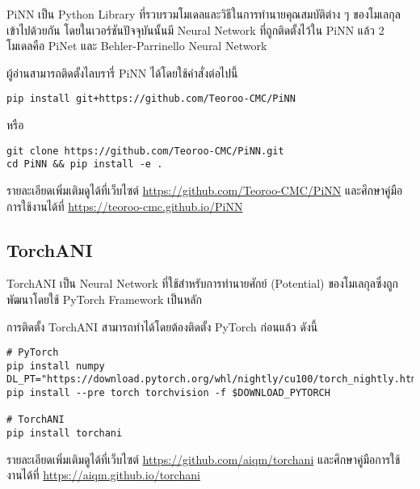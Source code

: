 PiNN\autocite{shao2020} เป็น Python Library ที่รวบรวมโมเดลและวิธีในการทำนายคุณสมบัติต่าง ๆ ของโมเลกุลเข้าไปด้วยกัน โดยในเวอร์ชันปัจจุบันนั้นมี Neural Network ที่ถูกติดตั้งไว้ใน PiNN แล้ว 2 โมเดลคือ PiNet และ Behler-Parrinello Neural Network

ผู้อ่านสามารถติดตั้งไลบรารี่ PiNN ได้โดยใช้คำสั่งต่อไปนี้

\begin{lstlisting}[style=MyBash]
pip install git+https://github.com/Teoroo-CMC/PiNN
\end{lstlisting}

\noindent หรือ

\begin{lstlisting}[style=MyBash]
git clone https://github.com/Teoroo-CMC/PiNN.git 
cd PiNN && pip install -e .
\end{lstlisting}

รายละเอียดเพิ่มเติมดูได้ที่เว็บไซต์ \url{https://github.com/Teoroo-CMC/PiNN} และศึกษาคู่มือการใช้งานได้ที่ \url{https://teoroo-cmc.github.io/PiNN}

\subsection{TorchANI}
\label{ssec:lib_torchani}

TorchANI\autocite{gao2020} เป็น Neural Network ที่ใช้สำหรับการทำนายศักย์ (Potential) ของโมเลกุลซึ่งถูกพัฒนาโดยใช้ PyTorch Framework เป็นหลัก 

การติดตั้ง TorchANI สามารถทำได้โดยต้องติดตั้ง PyTorch ก่อนแล้ว ดังนี้

\begin{lstlisting}[style=MyBash]
# PyTorch
pip install numpy
DL_PT="https://download.pytorch.org/whl/nightly/cu100/torch_nightly.html"
pip install --pre torch torchvision -f $DOWNLOAD_PYTORCH

# TorchANI
pip install torchani
\end{lstlisting}

รายละเอียดเพิ่มเติมดูได้ที่เว็บไซต์ \url{https://github.com/aiqm/torchani} และศึกษาคู่มือการใช้งานได้ที่ 
\url{https://aiqm.github.io/torchani}
